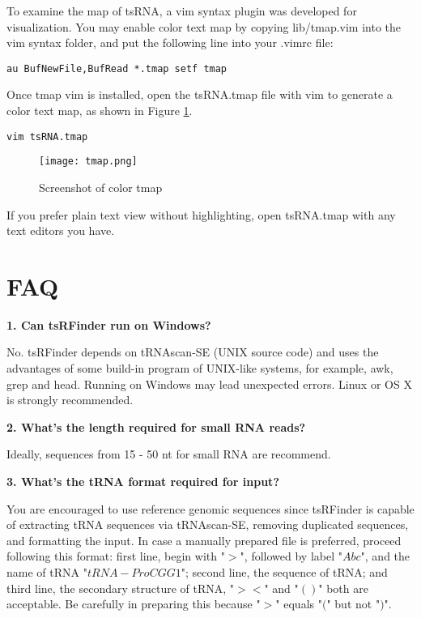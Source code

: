 \documentclass[11pt, a4paper]{article}
\begin{document}
To examine the map of tsRNA, a vim syntax plugin was developed for visualization. You may enable color text map by copying lib/tmap.vim into the vim syntax folder, and put the following line into your .vimrc file:

{\footnotesize \begin{tcolorbox}[colback=blue!5!white,colframe=pink!75!black,title=Set filetype tmap in vim]
\begin{verbatim}
au BufNewFile,BufRead *.tmap setf tmap
\end{verbatim}
\end{tcolorbox}}

Once tmap vim is installed, open the tsRNA.tmap file with vim to generate a color text map, as shown in Figure \ref{tmap}.

{\footnotesize \begin{tcolorbox}[colback=blue!5!white,colframe=pink!75!black,title=Visualization tsRNA.tmap]
\begin{verbatim}
vim tsRNA.tmap
\end{verbatim}
\end{tcolorbox}}

\begin{figure}[htbp]
\begin{center}
\texttt{[image: tmap.png]}
\caption{Screenshot of color tmap}
\label{tmap}
\end{center}
\end{figure}

If you prefer plain text view without highlighting, open tsRNA.tmap with any text editors you have.

\section{FAQ}

\textbf{1. Can tsRFinder run on Windows?}

No. tsRFinder depends on tRNAscan-SE (UNIX source code) and uses the advantages of some build-in program of UNIX-like systems, for example, awk, grep and head. Running on Windows may lead unexpected errors. Linux or OS X is strongly recommended.

\textbf{2. What's the length required for small RNA reads?}

Ideally, sequences from 15 - 50 nt for small RNA are recommend.

\textbf{3. What's the tRNA format required for input?}

You are encouraged to use reference genomic sequences since tsRFinder is capable of extracting tRNA sequences via tRNAscan-SE, removing duplicated sequences, and formatting the input. In case a manually prepared file is preferred, proceed following this format: first line, begin with "$>$", followed by label "$Abc$", and the name of tRNA "$tRNA-ProCGG1$"; second line, the sequence of tRNA; and third line, the secondary structure of tRNA, "$><$" and "$()$" both are acceptable. Be carefully in preparing this because "$>$" equals "$($" but not "$)$".
\end{document}
